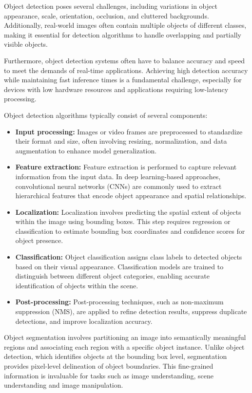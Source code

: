 Object detection poses several challenges, including variations in object appearance, scale, orientation, occlusion, and cluttered backgrounds. Additionally, real-world images often contain multiple objects of different classes, making it essential for detection algorithms to handle overlapping and partially visible objects.

Furthermore, object detection systems often have to balance accuracy and speed to meet the demands of real-time
applications. Achieving high detection accuracy while maintaining fast inference times is a fundamental challenge,
especially for devices with low hardware resources and applications requiring low-latency processing.

Object detection algorithms typically consist of several components:

\begin{itemize}
  \item \textbf{Input processing:} Images or video frames are preprocessed to standardize their format and size, often
involving resizing, normalization, and data augmentation to enhance model generalization.
  \item \textbf{Feature extraction:} Feature extraction is performed to capture relevant information from the input
  data. In deep learning-based approaches, convolutional neural networks (CNNs) are commonly used to extract hierarchical features that encode object appearance and spatial relationships.
  \item \textbf{Localization:} Localization involves predicting the spatial extent of objects within the image using
bounding boxes. This step requires regression or classification to estimate bounding box coordinates and confidence scores for object presence.
  \item \textbf{Classification:} Object classification assigns class labels to detected objects based on their visual
  appearance. Classification models are trained to distinguish between different object categories, enabling accurate identification of objects within the scene.
  \item \textbf{Post-processing:} Post-processing techniques, such as non-maximum suppression (NMS), are applied to
  refine detection results, suppress duplicate detections, and improve localization accuracy.
\end{itemize}

Object segmentation involves partitioning an image into semantically meaningful regions and associating each region
with a specific object instance. Unlike object detection, which identifies objects at the bounding box level, segmentation provides pixel-level delineation of object boundaries. This fine-grained information is invaluable for tasks such as image understanding, scene understanding and image manipulation.

